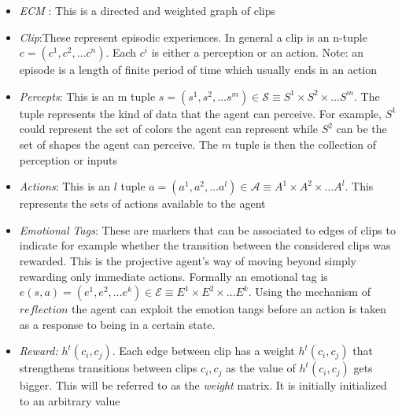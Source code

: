 \documentclass[twocolumn,prX,longbibliography]{revtex4}
\begin{document}
\begin{itemize}
 \item \textit{ECM} : This is a directed and weighted graph of clips
 \item \textit{Clip}:These represent episodic experiences. In general a clip is an n-tuple \(c =(c^{1}, c^{2}, \dots c^{n})\). Each \(c^{i}\) is either a perception or an action.
 Note: an episode is a length of finite period of time which usually ends in an action
 \item \textit{Percepts}: This is an m tuple \(s =(s^{1}, s^{2}, \dots s^{m}) \in \mathcal{S} \equiv S^1 \times S^2 \times  \dots S^m \). The tuple represents the kind of data that the agent can perceive. For example, \(S^1\) could represent the set of colors the agent can represent while \(S^2\) can be the set of shapes the agent can perceive. The \(m\) tuple is then the collection of perception or inputs
 \item \textit{Actions}: This is an \(l\) tuple \(a = (a^{1}, a^{2},\dots a^{l}) \in \mathcal{A} \equiv A^1 \times A^2 \times \dots A^{l}\). This represents the sets of actions available to the agent
 \item \textit{Emotional Tags}: These are markers that can be associated to edges of clips to indicate for example whether the transition between the considered clips was rewarded. This is the projective agent's way of moving beyond simply rewarding only immediate actions. Formally an emotional tag is \( e(s,a)= (e^1,e^2, \dots e^k) \in \mathcal{E} \equiv E^1 \times E^2 \times \dots E^k \). Using the mechanism of \(reflection\) the agent can exploit the emotion tangs before an action is taken as a response to being in a certain state.
 \item \textit{Reward:} \( h^t(c_i, c_j)\). Each edge between clip has a weight \( h^t(c_i, c_j)\) that strengthens transitions between clips \(c_i, c_j\) as the value of \( h^t(c_i, c_j)\) gets bigger. This will be referred to as the \textit{weight} matrix. It is initially initialized to an arbitrary value
 
\end{itemize}
\end{document}
